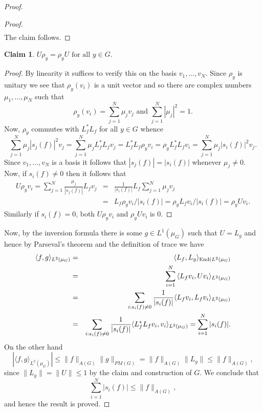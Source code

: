 \documentclass[12pt]{amsart}
\numberwithin{equation}{section}
\theoremstyle{plain}
\newtheorem*{claim}{Claim}
\theoremstyle{definition}
\renewcommand{\leq}{\leqslant}
\providecommand{\End}{\mathop{\rm End}\nolimits}
\begin{document}
\begin{proof}
\begin{proof}
\begin{eqnarray*}
\end{eqnarray*}
The claim follows.
\end{proof}
\begin{claim}
$U\rho_y = \rho_yU \textrm{ for all } y \in G$.
\end{claim}
\begin{proof}
By linearity it suffices to verify this on the basis $v_1,\dots,v_N$.   Since $\rho_y$ is unitary we see that $\rho_y(v_i)$ is a unit vector and so there are complex numbers $\mu_1,\dots,\mu_N$ such that
\begin{equation*}
\rho_y(v_i)=\sum_{j=1}^N{\mu_jv_j} \textrm{ and } \sum_{j=1}^N{|\mu_j|^2}=1.
\end{equation*}
Now, $\rho_y$ commutes with $L_f^*L_f$ for all $y \in G$ whence
\begin{equation*}
\sum_{j=1}^N{\mu_j|s_j(f)|^2v_j} = \sum_{j=1}^N{\mu_jL_f^*L_fv_j}=L_f^*L_f\rho_yv_i = \rho_yL_f^*L_fv_i = \sum_{j=1}^N{\mu_j|s_i(f)|^2v_j}.
\end{equation*}
Since $v_1,\dots,v_N$ is a basis it follows that $|s_j(f)|=|s_i(f)|$ whenever $\mu_j\neq 0$. Now, if $s_i(f)\neq 0$ then it follows that
\begin{eqnarray*}
U\rho_yv_i = \sum_{j=1}^N{\frac{\mu_j}{|s_j(f)|}L_fv_j}&=&\frac{1}{|s_i(f)|}L_f\sum_{j=1}^N{\mu_jv_j}\\ &=&L_f\rho_yv_i/|s_i(f)|=\rho_yL_fv_i/|s_i(f)| = \rho_yUv_i.
\end{eqnarray*}
Similarly if $s_i(f)=0$, both $U\rho_yv_i$ and $\rho_yUv_i$ is $0$.
\end{proof}
Now, by the inversion formula there is some $g \in  L^1(\mu_G)$ such that $U=L_g$ and hence by Parseval's theorem and the definition of trace we have
\begin{eqnarray*}
\langle f,g\rangle_{L^2(\mu_G)} & =& \langle L_f,L_g\rangle_{\End(L^2(\mu_G)}\\& =& \sum_{i=1}^N{\langle L_fv_i,Uv_i\rangle_{L^2(\mu_G)}}\\ & =& \sum_{i: s_i(f)\neq 0}{\frac{1}{|s_i(f)|}\langle L_fv_i,L_fv_i\rangle_{L^2(\mu_G)}}\\ & =& \sum_{i: s_i(f)\neq 0}{\frac{1}{|s_i(f)|}\langle L_f^* L_fv_i,v_i\rangle_{L^2(\mu_G)}} =  \sum_{i=1}^N{|s_i(f)|}.
\end{eqnarray*}
On the other hand
\begin{equation*}
|\langle f,g\rangle_{L^2(\mu_G)}| \leq \|f\|_{A(G)}\|g\|_{PM(G)} = \|f\|_{A(G)} \|L_g\|  \leq \|f\|_{A(G)},
\end{equation*}
since $\|L_g\|=\|U\| \leq 1$ by the claim and construction of $G$.  We conclude that
\begin{equation*}
\sum_{i=1}^N{|s_i(f)|}\leq \|f\|_{A(G)},
\end{equation*}
and hence the result is proved.
\end{proof}
\end{document}
